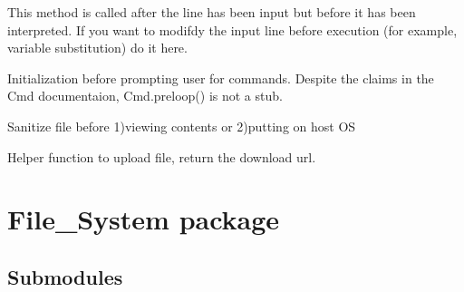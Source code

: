 \documentclass[letterpaper,10pt,english]{sphinxmanual}
\begin{document}
\begin{fulllineitems}

\begin{fulllineitems}
\label{main:main.Console.precmd}
This method is called after the line has been input but before
it has been interpreted. If you want to modifdy the input line
before execution (for example, variable substitution) do it here.

\end{fulllineitems}


\begin{fulllineitems}
\label{main:main.Console.preloop}
Initialization before prompting user for commands.
Despite the claims in the Cmd documentaion,
Cmd.preloop() is not a stub.

\end{fulllineitems}


\begin{fulllineitems}
\label{main:main.Console.san_file}
Sanitize file before 1)viewing contents or 2)putting on host OS

\end{fulllineitems}


\begin{fulllineitems}
\label{main:main.Console.uploadfile}
Helper function to upload file, return the download url.

\end{fulllineitems}


\end{fulllineitems}



\section{File\_System package}
\label{File_System::doc}\label{File_System:file-system-package}

\subsection{Submodules}
\label{File_System:submodules}
\end{document}
